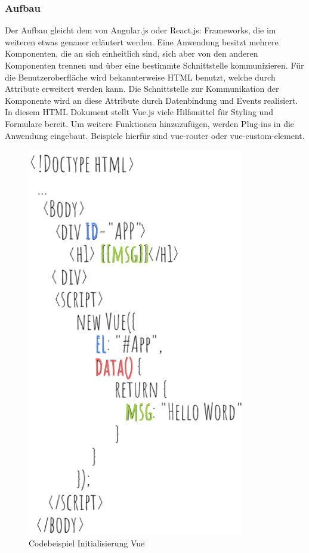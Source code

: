 \subsubsection*{Aufbau}
Der Aufbau gleicht dem von Angular.js oder React.js: Frameworks, die im weiteren etwas genauer erl\"autert werden. Eine Anwendung besitzt mehrere Komponenten, die an sich einheitlich sind, sich aber von den anderen Komponenten trennen und \"uber eine bestimmte Schnittstelle kommunizieren. F\"ur die Benutzeroberfl\"ache wird bekannterweise \ac{HTML} benutzt, welche durch Attribute erweitert werden kann. Die Schnittstelle zur Kommunikation der Komponente wird an diese Attribute durch Datenbindung und Events realisiert. In diesem \ac{HTML} Dokument stellt Vue.js viele Hilfsmittel f\"ur Styling und Formulare bereit. Um weitere Funktionen hinzuzuf\"ugen, werden Plug-ins in die Anwendung eingebaut\cite{Springer2017}. Beispiele hierf\"ur sind vue-router oder vue-custom-element.
\begin{figure}[h] 
\centering
\includegraphics[scale=0.5]{fig/gettingStartedVue.PNG} 
\caption{Codebeispiel Initialisierung Vue}
\label{fig:CodeVueInit}
\end{figure} 
